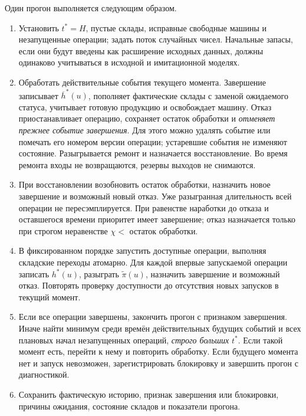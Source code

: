 Один прогон выполняется следующим образом.
\begin{enumerate}
  \item Установить $t^{*}=H$, пустые склады, исправные свободные машины и незапущенные операции; задать поток случайных чисел. Начальные запасы, если они будут введены как расширение исходных данных, должны одинаково учитываться в исходной и имитационной моделях.
  \item Обработать действительные события текущего момента. Завершение записывает $\overline{h}^{*}(u)$, пополняет фактические склады с заменой ожидаемого статуса, учитывает готовую продукцию и освобождает машину. Отказ приостанавливает операцию, сохраняет остаток обработки и \emph{отменяет прежнее событие завершения}. Для этого можно удалять событие или помечать его номером версии операции; устаревшие события не изменяют состояние. Разыгрывается ремонт и назначается восстановление. Во время ремонта входы не возвращаются, резервы выходов не снимаются.
  \item При восстановлении возобновить остаток обработки, назначить новое завершение и возможный новый отказ. Уже разыгранная длительность всей операции не пересэмплируется. При равенстве наработки до отказа и оставшегося времени приоритет имеет завершение; отказ назначается только при строгом неравенстве $\chi<$ остаток обработки.
  \item В фиксированном порядке запустить доступные операции, выполняя складские переходы атомарно. Для каждой впервые запускаемой операции записать $h^{*}(u)$, разыграть $\widetilde{\pi}(u)$, назначить завершение и возможный отказ. Повторять проверку доступности до отсутствия новых запусков в текущий момент.
  \item Если все операции завершены, закончить прогон с признаком завершения. Иначе найти минимум среди времён действительных будущих событий и всех плановых начал незапущенных операций, \emph{строго больших} $t^{*}$. Если такой момент есть, перейти к нему и повторить обработку. Если будущего момента нет и запуск невозможен, зарегистрировать блокировку и завершить прогон с диагностикой.
  \item Сохранить фактическую историю, признак завершения или блокировки, причины ожидания, состояние складов и показатели прогона.
\end{enumerate}

